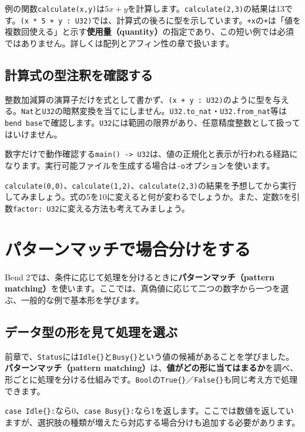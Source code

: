 \documentclass[11pt,a4paper,openany]{book}
\newcommand{\code}[1]{\texttt{#1}}
\newcommand{\term}[1]{\textbf{#1}}
\newcommand{\readcode}[2]{}
\newcommand{\exercise}[1]{\begin{exercisebox}#1\end{exercisebox}}
\begin{document}
\readcode{02_arithmetic.bend}{整数の乗算と加算（02\_arithmetic.bend）}
例の関数\code{calculate(x,y)}は\(5x+y\)を計算します。\code{calculate(2,3)}の結果は13です。\code{(x * 5 + y : U32)}では、計算式の後ろに型を示しています。\code{+x}の\code{+}は「値を複数回使える」と示す\term{使用量（quantity）}の指定であり、この短い例では必須ではありません。詳しくは配列とアフィン性の章で扱います。

\section{計算式の型注釈を確認する}
整数加減算の演算子だけを式として書かず、\code{(x + y : U32)}のように型を与える。\code{Nat}と\code{U32}の暗黙変換を当てにしません。\code{U32.to\_nat}・\code{U32.from\_nat}等は\code{bend base}で確認します。\code{U32}には範囲の限界があり、任意精度整数として扱ってはいけません。

\begin{pointbox}
数字だけで動作確認する\code{main() -> U32}は、値の正規化と表示が行われる経路になります。実行可能ファイルを生成する場合は\code{-o}オプションを使います。
\end{pointbox}

\exercise{\code{calculate(0,0)}、\code{calculate(1,2)}、\code{calculate(2,3)}の結果を予想してから実行してみましょう。式の5を10に変えると何が変わるでしょうか。また、定数5を引数\code{factor: U32}に変える方法も考えてみましょう。}

\chapter{パターンマッチで場合分けをする}
\begin{tcolorbox}[colback=blue!3,colframe=blue!16,boxrule=.35pt,arc=1mm,left=3mm,right=3mm,top=2mm,bottom=2mm]
\small Bend 2では、条件に応じて処理を分けるときに\term{パターンマッチ（pattern matching）}を使います。ここでは、真偽値に応じて二つの数字から一つを選ぶ、一般的な例で基本形を学びます。
\end{tcolorbox}

\section{データ型の形を見て処理を選ぶ}
前章で、\code{Status}には\code{Idle\{\}}と\code{Busy\{\}}という値の候補があることを学びました。\term{パターンマッチ（pattern matching）}は、\textbf{値がどの形に当てはまるか}を調べ、形ごとに処理を分ける仕組みです。\code{Bool}の\code{True\{\}}／\code{False\{\}}も同じ考え方で処理できます。
\readcode{13_status_adt.bend}{ユーザー定義型をパターンマッチする例（13\_status\_adt.bend）}
\code{case Idle\{\}:}なら0、\code{case Busy\{\}:}なら1を返します。ここでは数値を返していますが、選択肢の種類が増えたら対応する場合分けも追加する必要があります。
\end{document}
